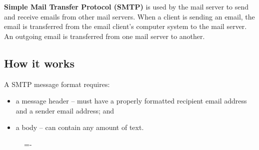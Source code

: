\documentclass[a4paper]{systems-software}
\begin{document}
\textbf{Simple Mail Transfer Protocol (SMTP)} is used by the mail server to send and receive emails from other mail servers. When a client is sending an email, the email is transferred from the email client’s computer system to the mail server. An outgoing email is transferred from one mail server to another.


\subsection*{How it works}

A SMTP message format requires:
\begin{itemize}
	\item a message header -- must have a properly formatted recipient email address and a sender email address; and
	\item a body -- can contain any amount of text.
\end{itemize}

\begin{figure}[H]
	\lineskip=-\fboxrule
\end{figure}
\end{document}
